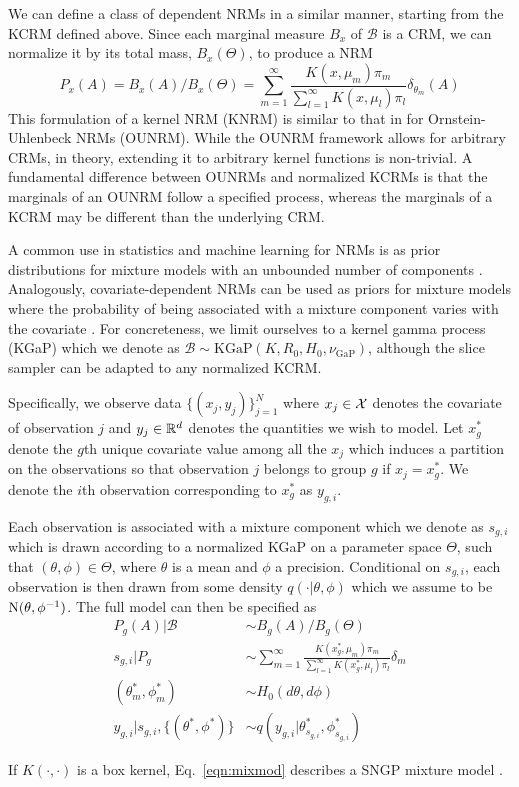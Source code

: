 We can define a class of dependent NRMs in a similar manner, starting from the
KCRM defined above. Since each marginal measure $B_x$ of $\mathcal{B}$ is a
CRM, we can normalize it by its total mass, $B_x(\Theta)$, to produce a NRM
\begin{equation} 
  P_x(A) = B_x(A) / B_x(\Theta) = \sum_{m=1}^\infty
  \frac{K(x,\mu_m)\pi_m}{\sum_{l=1}^\infty K(x,\mu_l)\pi_l}\delta_{\theta_m}(A)
  \label{eqn:nkcrm} 
\end{equation} 
This formulation of a kernel NRM (KNRM) is
similar to that in \cite{Griffin:2007} for Ornstein-Uhlenbeck NRMs (OUNRM).
While the OUNRM framework allows for arbitrary CRMs, in theory,
extending it to arbitrary kernel functions is non-trivial.
A fundamental difference between OUNRMs and normalized KCRMs is that the 
marginals of an 
OUNRM follow a specified process, whereas the marginals of a KCRM may be
different than the underlying CRM.

A common use in statistics and machine learning for NRMs is as prior
distributions for mixture models with an unbounded number of components
\cite{FavaroTeh:2012}.  Analogously, covariate-dependent NRMs can be used as priors for
mixture models where the probability of being associated with a mixture
component varies with the covariate \cite{Rao:Teh:2009,Griffin:2007}.  For concreteness, we
limit ourselves to a kernel gamma process (KGaP) which we denote as
$\mathcal{B} \sim \text{KGaP}(K, R_0, H_0, \nu_{\text{GaP}})$, although the
slice sampler can be adapted to any normalized KCRM.

Specifically, we observe data $\{(x_j,y_j)\}_{j=1}^N$ where $x_j \in \mathcal{X}$
denotes the covariate of observation $j$ and $y_j \in \mathbb{R}^d$ denotes
the quantities we wish to model.  Let $x^*_g$ denote the $g$th unique covariate
value among all the $x_j$ which induces a partition on the observations
so that observation $j$ belongs to group $g$ if $x_j = x^*_g$.  We
denote the $i$th observation corresponding to $x^*_g$ as $y_{g,i}$.

Each observation is associated with a mixture component which we denote as
$s_{g,i}$ which is drawn according to a normalized KGaP on a parameter space
$\Theta$, such that $(\theta,\phi) \in \Theta$, where $\theta$ is a mean and $\phi$
a precision.
Conditional on $s_{g,i}$, each observation is then drawn from some density
$q(\cdot|\theta,\phi)$ which we assume to be $\text{N}(\theta,\phi^{-1})$.  The full model
can then be specified as 
\begin{equation}
  \begin{aligned} 
    P_g(A) | \mathcal{B} &\sim B_g(A)/B_g(\Theta) \\
    s_{g,i} | P_g &\sim \sum_{m=1}^\infty \frac{ K(x^*_g,\mu_m)\pi_m }
    { \sum_{l=1}^\infty K(x^*_g,\mu_l)\pi_l } \delta_{m} \\
    (\theta^*_m,\phi^*_m) &\sim H_0(d\theta,d\phi) \\
    y_{g,i} | s_{g,i}, \{(\theta^*,\phi^*)\} &\sim 
    q(y_{g,i}|\theta^*_{s_{g,i}},\phi^*_{s_{g,i}}) 
  \end{aligned}
  \label{eqn:mixmod}
\end{equation}

If $K(\cdot,\cdot)$ is a box kernel, Eq.~\ref{eqn:mixmod} describes a
SNGP mixture model \cite{Rao:Teh:2009}.
